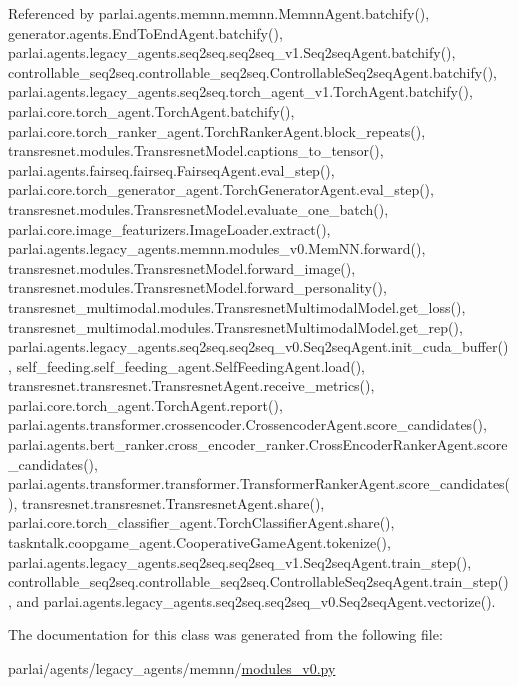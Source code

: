 Referenced by parlai.\+agents.\+memnn.\+memnn.\+Memnn\+Agent.\+batchify(), generator.\+agents.\+End\+To\+End\+Agent.\+batchify(), parlai.\+agents.\+legacy\+\_\+agents.\+seq2seq.\+seq2seq\+\_\+v1.\+Seq2seq\+Agent.\+batchify(), controllable\+\_\+seq2seq.\+controllable\+\_\+seq2seq.\+Controllable\+Seq2seq\+Agent.\+batchify(), parlai.\+agents.\+legacy\+\_\+agents.\+seq2seq.\+torch\+\_\+agent\+\_\+v1.\+Torch\+Agent.\+batchify(), parlai.\+core.\+torch\+\_\+agent.\+Torch\+Agent.\+batchify(), parlai.\+core.\+torch\+\_\+ranker\+\_\+agent.\+Torch\+Ranker\+Agent.\+block\+\_\+repeats(), transresnet.\+modules.\+Transresnet\+Model.\+captions\+\_\+to\+\_\+tensor(), parlai.\+agents.\+fairseq.\+fairseq.\+Fairseq\+Agent.\+eval\+\_\+step(), parlai.\+core.\+torch\+\_\+generator\+\_\+agent.\+Torch\+Generator\+Agent.\+eval\+\_\+step(), transresnet.\+modules.\+Transresnet\+Model.\+evaluate\+\_\+one\+\_\+batch(), parlai.\+core.\+image\+\_\+featurizers.\+Image\+Loader.\+extract(), parlai.\+agents.\+legacy\+\_\+agents.\+memnn.\+modules\+\_\+v0.\+Mem\+N\+N.\+forward(), transresnet.\+modules.\+Transresnet\+Model.\+forward\+\_\+image(), transresnet.\+modules.\+Transresnet\+Model.\+forward\+\_\+personality(), transresnet\+\_\+multimodal.\+modules.\+Transresnet\+Multimodal\+Model.\+get\+\_\+loss(), transresnet\+\_\+multimodal.\+modules.\+Transresnet\+Multimodal\+Model.\+get\+\_\+rep(), parlai.\+agents.\+legacy\+\_\+agents.\+seq2seq.\+seq2seq\+\_\+v0.\+Seq2seq\+Agent.\+init\+\_\+cuda\+\_\+buffer(), self\+\_\+feeding.\+self\+\_\+feeding\+\_\+agent.\+Self\+Feeding\+Agent.\+load(), transresnet.\+transresnet.\+Transresnet\+Agent.\+receive\+\_\+metrics(), parlai.\+core.\+torch\+\_\+agent.\+Torch\+Agent.\+report(), parlai.\+agents.\+transformer.\+crossencoder.\+Crossencoder\+Agent.\+score\+\_\+candidates(), parlai.\+agents.\+bert\+\_\+ranker.\+cross\+\_\+encoder\+\_\+ranker.\+Cross\+Encoder\+Ranker\+Agent.\+score\+\_\+candidates(), parlai.\+agents.\+transformer.\+transformer.\+Transformer\+Ranker\+Agent.\+score\+\_\+candidates(), transresnet.\+transresnet.\+Transresnet\+Agent.\+share(), parlai.\+core.\+torch\+\_\+classifier\+\_\+agent.\+Torch\+Classifier\+Agent.\+share(), taskntalk.\+coopgame\+\_\+agent.\+Cooperative\+Game\+Agent.\+tokenize(), parlai.\+agents.\+legacy\+\_\+agents.\+seq2seq.\+seq2seq\+\_\+v1.\+Seq2seq\+Agent.\+train\+\_\+step(), controllable\+\_\+seq2seq.\+controllable\+\_\+seq2seq.\+Controllable\+Seq2seq\+Agent.\+train\+\_\+step(), and parlai.\+agents.\+legacy\+\_\+agents.\+seq2seq.\+seq2seq\+\_\+v0.\+Seq2seq\+Agent.\+vectorize().



The documentation for this class was generated from the following file\+:\begin{DoxyCompactItemize}
\item 
parlai/agents/legacy\+\_\+agents/memnn/\hyperlink{memnn_2modules__v0_8py}{modules\+\_\+v0.\+py}\end{DoxyCompactItemize}
